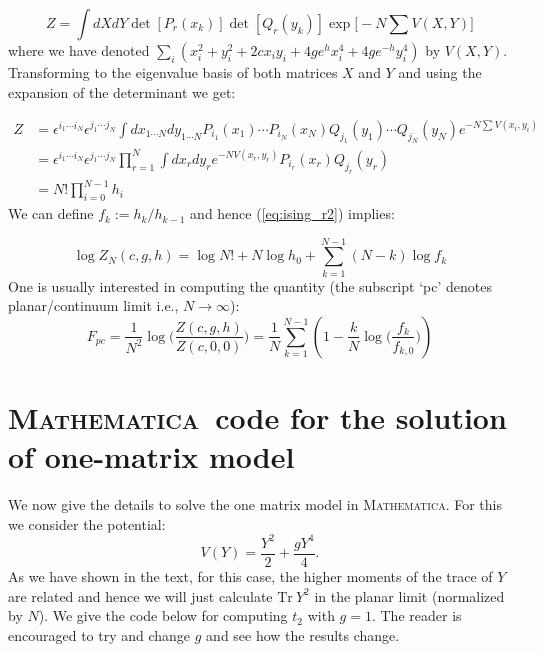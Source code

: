 \documentclass[11pt]{article}
\newcommand{\MA}{\textsc{Mathematica}}
\begin{document}
\begin{equation}
	Z = \int dX dY \det[P_{r}(x_k)] \det[Q_{r}(y_k)] \exp\Big[-N \sum V(X,Y)\Big]
\end{equation}
where we have denoted $\sum_{i} (x_{i}^2 + y_{i}^{2} +2c x_{i}y_{i} + 4ge^{h}x_{i}^{4} + 4ge^{-h}y_{i}^4)$ by $V(X,Y)$. 
Transforming to the eigenvalue basis of both matrices $X$ and $Y$ and using the expansion of the determinant we get:

\begin{align}
	Z &= \epsilon^{i_1 \cdots i_N} \epsilon^{j_1 \cdots j_N} \int dx_{1 \cdots N}
	dy_{1 \cdots N} P_{i_{1}}(x_1) \cdots P_{i_{N}}(x_N)
	Q_{j_{1}}(y_1) \cdots Q_{j_{N}}(y_N)
	e^{-N \sum V(x_i,y_i)} \nonumber  \\  
	&= \epsilon^{i_1 \cdots i_N} \epsilon^{j_1 \cdots j_N} \prod_{r=1}^{N} \int dx_{r} dy_{r} e^{-N V(x_r, y_r)} P_{i_r}(x_r) Q_{j_r}(y_r) \nonumber  \\  
	&=  N! \prod_{i=0}^{N-1} h_{i} 
	\label{eq:ising_r2}
\end{align}
We can define $f_{k} := h_k/h_{k-1}$ and hence 
(\ref{eq:ising_r2}) implies:

\begin{equation}
	\log Z_{N}(c,g,h) = \log N! + N \log h_0 + \sum_{k=1}^{N-1} (N-k) \log f_{k} 
\end{equation}
One is usually interested in computing the quantity (the subscript `pc' denotes planar/continuum limit i.e., $ N \to \infty$):
\begin{equation}
	F_{pc} = \frac{1}{N^2} \log\Bigg( \frac{Z(c,g,h)}{Z(c,0,0)}\Bigg) = \frac{1}{N} \sum_{k=1}^{N-1} \left(1 - \frac{k}{N} \log \Big(\frac{f_k}{f_{k,0}}\Big)\right)
\end{equation}

\section{\label{sec:math_code}\MA~code for the solution of one-matrix model}
We now give the details to solve the one matrix model in \MA. For this we consider the potential:
\[ V(Y) = \frac{Y^2}{2} + \frac{gY^4}{4}.\]
As we have shown in the text, for this case, the higher moments of the trace of $Y$ are related and hence we will just calculate $\mbox{Tr}~Y^2$ in the planar limit (normalized by $N$). We give the code below for computing $t_{2}$ with $g=1$. The reader is encouraged to try and change $g$ and see how the results change.
\end{document}
